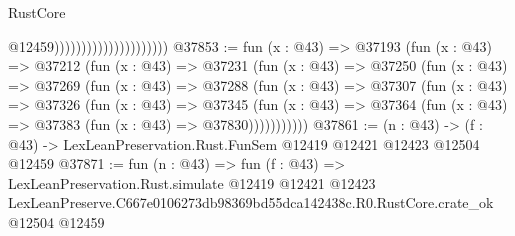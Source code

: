 \begin{lexlean}{RustCore}
\begin{coremodule}
                                              @12459)))))))))))))))))))))
@37853 := fun (x : @43) =>
  @37193
    (fun (x : @43) =>
    @37212
      (fun (x : @43) =>
      @37231
        (fun (x : @43) =>
        @37250
          (fun (x : @43) =>
          @37269
            (fun (x : @43) =>
            @37288
              (fun (x : @43) =>
              @37307
                (fun (x : @43) =>
                @37326
                  (fun (x : @43) =>
                  @37345
                    (fun (x : @43) =>
                    @37364 (fun (x : @43) => @37383 (fun (x : @43) => @37830)))))))))))
@37861 := (n : @43) ->
  (f : @43) -> LexLeanPreservation.Rust.FunSem @12419 @12421 @12423 @12504 @12459
@37871 := fun (n : @43) =>
  fun (f : @43) =>
  LexLeanPreservation.Rust.simulate
    @12419
    @12421
    @12423
    LexLeanPreserve.C667e0106273db98369bd55dca142438c.R0.RustCore.crate_ok
    @12504
    @12459
\end{coremodule}
\end{lexlean}
